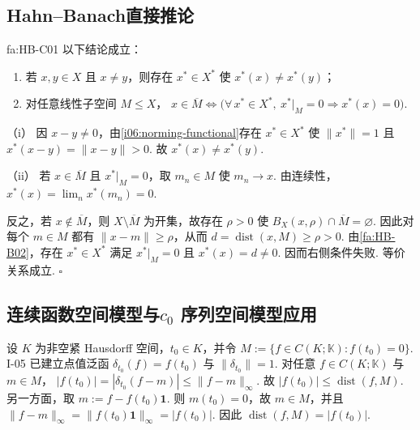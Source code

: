 \subsection{Hahn--Banach直接推论}

\begin{FAProposition}{fa:HB-C01}
以下结论成立：
\begin{enumerate}[label=\textnormal{(\roman*)}]
\item 若 \(\displaystyle x,y\in X\) 且 \(\displaystyle x\neq y\)，则存在 \(\displaystyle x^*\in X^*\) 使 \(\displaystyle x^*(x)\neq x^*(y)\)；
\item 对任意线性子空间 \(\displaystyle M\leqslant X\)， \(\displaystyle x\in\overline M \iff \bigl(\forall\,x^*\in X^*,\ x^*|_M=0\Longrightarrow x^*(x)=0\bigr)\).
\end{enumerate}
\end{FAProposition}

\begin{FAProof}
（i） 因 \(\displaystyle x-y\neq0\)，由\autoref{i06:norming-functional}存在 \(\displaystyle x^*\in X^*\) 使 \(\displaystyle \|x^*\|=1\) 且 \(\displaystyle x^*(x-y)=\|x-y\|>0\).
故 \(\displaystyle x^*(x)\neq x^*(y)\).

（ii） 若 \(\displaystyle x\in\overline M\) 且 \(\displaystyle x^*|_M=0\)，取 \(\displaystyle m_n\in M\) 使 \(\displaystyle m_n\to x\). 由连续性，\(\displaystyle x^*(x)=\lim_nx^*(m_n)=0\).

反之，若 \(\displaystyle x\notin\overline M\)，则 \(\displaystyle X\setminus\overline M\) 为开集，故存在 \(\displaystyle \rho>0\) 使 \(\displaystyle B_X(x,\rho)\cap\overline M=\varnothing\). 因此对每个 \(\displaystyle m\in M\) 都有 \(\displaystyle \|x-m\|\geqslant\rho\)，从而 \(\displaystyle d=\operatorname{dist}(x,M)\geqslant\rho>0\). 由\autoref{fa:HB-B02}，存在 \(\displaystyle x^*\in X^*\) 满足 \(\displaystyle x^*|_M=0\) 且 \(\displaystyle x^*(x)=d\neq0\). 因而右侧条件失败. 等价关系成立.
\hfill\(\square\)
\end{FAProof}

\subsection{连续函数空间模型与\(\displaystyle c_0\) 序列空间模型应用}

\begin{FAApplication}[函数值约束的距离]\label{i06:ex-cont-distance}
设 \(\displaystyle K\) 为非空紧 Hausdorff 空间，\(\displaystyle t_0\in K\)，并令 \(\displaystyle M:=\{f\in C(K;\mathbb K):f(t_0)=0\}\).
I-05 已建立点值泛函 \(\displaystyle \delta_{t_0}(f)=f(t_0)\) 与 \(\displaystyle \|\delta_{t_0}\|=1\). 对任意 \(\displaystyle f\in C(K;\mathbb K)\) 与 \(\displaystyle m\in M\)， \(\displaystyle |f(t_0)| =|\delta_{t_0}(f-m)| \leqslant\|f-m\|_\infty\).
故 \(\displaystyle |f(t_0)|\leqslant\operatorname{dist}(f,M)\). 另一方面，取 \(\displaystyle m:=f-f(t_0)\mathbf1\).
则 \(\displaystyle m(t_0)=0\)，故 \(\displaystyle m\in M\)，并且 \(\displaystyle \|f-m\|_\infty =\|f(t_0)\mathbf1\|_\infty =|f(t_0)|\).
因此 \(\displaystyle \operatorname{dist}(f,M)=|f(t_0)|\).
\end{FAApplication}

